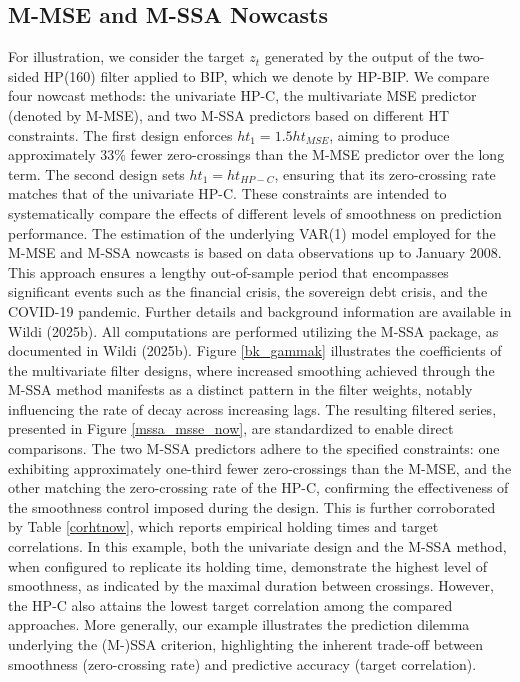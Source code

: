 \documentclass[a4paper]{article}
\begin{document}
\subsection{M-MSE and M-SSA Nowcasts}

For illustration, we consider the target $z_t$ generated by the output of the two-sided HP(160) filter applied to BIP, which we denote by HP-BIP. We compare four nowcast methods: the univariate HP-C, the multivariate MSE predictor (denoted by M-MSE), and two M-SSA predictors based on different HT constraints. The first design enforces $ht_1=1.5ht_{MSE}$, aiming to produce approximately $33\%$ fewer zero-crossings than the M-MSE predictor over the long term. The second design sets $ht_1=ht_{HP-C}$, ensuring that its zero-crossing rate matches that of the univariate HP-C. These constraints are intended to systematically compare the effects of different levels of smoothness on prediction performance. The estimation of the underlying VAR(1) model employed for the M-MSE and M-SSA nowcasts is based on data observations up to January 2008. This approach ensures a lengthy out-of-sample period that encompasses significant events such as the financial crisis, the sovereign debt crisis, and the COVID-19 pandemic. Further details and background information are available in Wildi (2025b). All computations are performed utilizing the M-SSA package, as documented in Wildi (2025b).
Figure \ref{bk_gammak} illustrates the coefficients of the multivariate filter designs, where increased smoothing achieved through the M-SSA method manifests as a distinct pattern in the filter weights, notably influencing the rate of decay across increasing lags. The resulting filtered series, presented in Figure \ref{mssa_msse_now}, are standardized to enable direct comparisons. The two M-SSA predictors adhere to the specified constraints: one exhibiting approximately one-third fewer zero-crossings than the M-MSE, and the other matching the zero-crossing rate of the HP-C, confirming the effectiveness of the smoothness control imposed during the design. This is further corroborated by Table \ref{corhtnow}, which reports empirical holding times and target correlations.  In this example, both the univariate design and the M-SSA method, when configured to replicate its holding time, demonstrate the highest level of smoothness, as indicated by the maximal duration between crossings. However, the HP-C also attains the lowest target correlation among the compared approaches. More generally, our example illustrates the prediction dilemma underlying the (M-)SSA criterion, highlighting the inherent trade-off between smoothness (zero-crossing rate) and predictive accuracy (target correlation).
\end{document}
